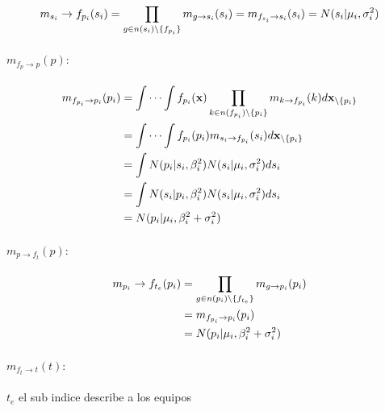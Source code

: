 \documentclass[11pt,twoside, spanish]{report} %
\begin{document}
\begin{equation}
	\centering
	m_{s_i}\rightarrow f_{p_i}(s_i) = \prod_{g\in n(s_i)\backslash\{f_{p_i}\}} m_{g\rightarrow s_i}(s_i)
	= m_{f_{s_i}\rightarrow s_i}(s_i)
	=  N(s_i \vert \mu_i,\sigma_i^2)
\end{equation}

\paragraph{$m_{f_{p}\rightarrow p}(p):$}

\begin{equation}
	\centering
	\begin{split}
		m_{f_{p_i}\rightarrow p_i}(p_i) & = \int\cdots\int f_{p_i}(\textbf{x})\prod_{k\in n(f_{p_i})\backslash\{p_i\}} m_{k\rightarrow f_{p_i}}(k)d\textbf{x}_{\backslash \{p_i\}} \\
		& = \int\cdots\int f_{p_i}(p_i) m_{s_i\rightarrow f_{p_i}}(s_i)d\textbf{x}_{\backslash \{p_i\}} \\
		& = \int N(p_i \vert s_i,\beta_i^2) N(s_i \vert \mu_i,\sigma_i^2)ds_i \\
		& = \int N(s_i \vert p_i,\beta_i^2) N(s_i \vert \mu_i,\sigma_i^2)ds_i \\
		& =  N(p_i \vert \mu_i,\beta_i^2+\sigma_i^2)
	\end{split}
\end{equation}

\paragraph{$m_{p\rightarrow f_{t}}(p):$}

\begin{equation}
	\centering
	\begin{split}
		m_{p_i}\rightarrow f_{t_e}(p_i) & = \prod_{g\in n(p_i)\backslash\{f_{t_e}\}} m_{g\rightarrow p_i}(p_i) \\
		& = m_{f_{p_i}\rightarrow p_i}(p_i) \\
		& =  N(p_i \vert \mu_i,\beta_i^2+\sigma_i^2)
	\end{split}
\end{equation}

\paragraph{$m_{f_{t}\rightarrow t}(t):$} $t_e$ el sub indice describe a los equipos
\end{document}
